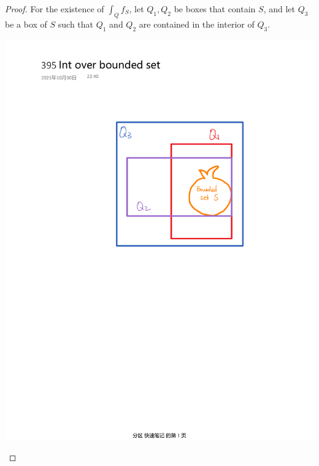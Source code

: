 \documentclass[15pt]{book}
\theoremstyle{break}
\theoremstyle{break}
\begin{document}
\begin{proof}
For the existence of $\int_Q f_S$, let $Q_1,Q_2$ be boxes that contain $S$, and let $Q_3$ be a box of $S$ such that $Q_1$ and $Q_2$ are contained in the interior of $Q_3$. 

\begin{center}
\includegraphics[scale=0.6]{IntOverBddSet.pdf}
\end{center}


\end{proof}
\end{document}
